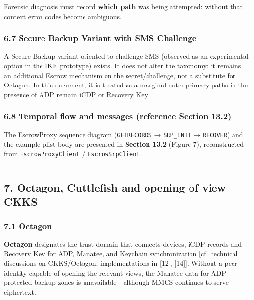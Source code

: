\documentclass[
  english,
  10pt]{article}
\begin{document}
Forensic diagnosis must record \textbf{which path} was being attempted:
without that context error codes become ambiguous.

\subsubsection{6.7 Secure Backup Variant with SMS
Challenge}\label{secure-backup-variant-with-sms-challenge}

A Secure Backup variant oriented to challenge SMS (observed as an
experimental option in the IKE prototype) exists. It does not alter the
taxonomy: it remains an additional Escrow mechanism on the
secret/challenge, not a substitute for Octagon. In this document, it is
treated as a marginal note: primary paths in the presence of ADP remain
iCDP or Recovery Key.

\subsubsection{6.8 Temporal flow and messages (reference Section
13.2)}\label{temporal-flow-and-messages-reference-section-13.2}

The EscrowProxy sequence diagram (\texttt{GETRECORDS} →
\texttt{SRP\_INIT} → \texttt{RECOVER}) and the example plist body are
presented in \textbf{Section 13.2} (Figure 7), reconstructed from
\texttt{EscrowProxyClient} / \texttt{EscrowSrpClient}.

\begin{center}\rule{0.5\linewidth}{0.5pt}\end{center}

\subsection{7. Octagon, Cuttlefish and opening of view
CKKS}\label{octagon-cuttlefish-and-opening-of-view-ckks}

\subsubsection{7.1 Octagon}\label{octagon}

\textbf{Octagon} designates the trust domain that connects devices, iCDP
records and Recovery Key for ADP, Manatee, and Keychain synchronization
{[}cf.~technical discussions on CKKS/Octagon; implementations in
{[}12{]}, {[}14{]}{]}. Without a peer identity capable of opening the
relevant views, the Manatee data for ADP-protected backup zones is
unavailable---although MMCS continues to serve ciphertext.
\end{document}
